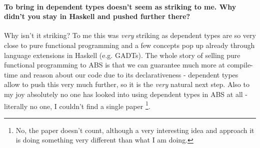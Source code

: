 \paragraph{To bring in dependent types doesn't seem as striking to me. Why didn't you stay in Haskell and pushed further there?}
Why isn't it striking? To me this was \textit{very} striking as dependent types are so very close to pure functional programming and a few concepts pop up already through language extensions in Haskell (e.g. GADTs). The whole story of selling pure functional programming to ABS is that we can guarantee much more at compile-time and reason about our code due to its declarativeness - dependent types allow to push this very much further, so it is the \textit{very} natural next step. Also to my joy absolutely no one has looked into using dependent types in ABS at all - literally no one, I couldn't find a single paper \footnote{No, the paper \cite{botta_functional_2011} doesn't count, although a very interesting idea and approach it is doing something very different than what I am doing.}.